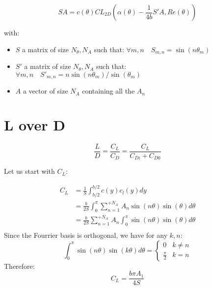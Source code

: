 \documentclass[letterpaper,12pt]{article}
\begin{document}
\begin{equation}
	SA = c(\theta) CL_{2D} \left( \alpha(\theta) - \frac {1}{4b} S' A , Re(\theta)\right) 
\end{equation}

with:
\begin{itemize}
	\item[] $S$ a matrix of size $N_{\theta}, N_A$ such that: $ \forall m,n \quad S_{m,n} = \sin(n\theta_m)$ 
	\item[] $S'$ a matrix of size $N_{\theta}, N_A$ such that: $ \forall m,n \quad {S'}_{m,n} = n\sin(n\theta_m)/\sin(\theta_m)$ 
	\item[] $A$ a vector of size $N_A$ containing all the $A_n$
\end{itemize}


\section{L over D}

\begin{equation*}
	\frac L D = \frac{C_L}{C_D} = \frac {C_L} {C_{Di} + C_{D0}} 
\end{equation*}

Let us start with $C_L$:

\begin{align}
	C_L &= \frac 1 S \int_{b/2}^{b/2} c(y) c_l(y) dy  \nonumber \\
		&= \frac b {2S} \int_{0}^{\pi} \sum_{n=1}^{+N_A} A_n \sin(n\theta) \sin(\theta)d\theta \nonumber \\
		&= \frac b {2S}  \sum_{n=1}^{+N_A} A_n \int_{0}^{\pi} \sin(n\theta) \sin(\theta)d\theta \nonumber \\
\end{align}
Since the Fourrier basis is orthogonal, we have for any $k, n$:
\begin{equation*}
	\int_0^{\pi} \sin(n\theta)\sin(k\theta)d\theta = 
	\begin{cases} 
		0 & k \neq n \\
		\frac{\pi}{2} & k = n
	 \end{cases}
\end{equation*}
Therefore:
\begin{equation*}
	C_L = \frac{b \pi A_1}{4S}
\end{equation*}
\end{document}
